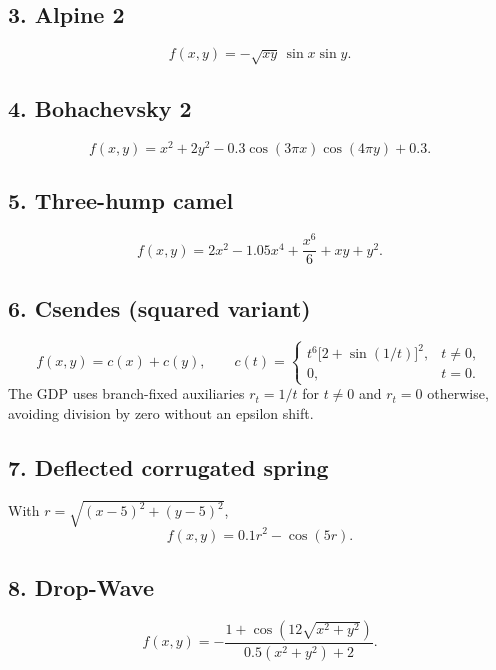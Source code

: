 \subsection*{3. Alpine 2}
\begin{equation}\label{eq:supp-alpine2}
f(x,y)=-\sqrt{xy}\,\sin x\sin y.
\end{equation}

\subsection*{4. Bohachevsky 2}
\begin{equation}\label{eq:supp-bohachevsky2}
f(x,y)=x^2+2y^2-0.3\cos(3\pi x)\cos(4\pi y)+0.3.
\end{equation}

\subsection*{5. Three-hump camel}
\begin{equation}\label{eq:supp-camel3}
f(x,y)=2x^2-1.05x^4+\frac{x^6}{6}+xy+y^2.
\end{equation}

\subsection*{6. Csendes (squared variant)}
\begin{equation}\label{eq:supp-csendes}
f(x,y)=c(x)+c(y),\qquad
c(t)=\begin{cases}
t^6\bigl[2+\sin(1/t)\bigr]^2,&t\ne0,\\
0,&t=0.
\end{cases}
\end{equation}
The GDP uses branch-fixed auxiliaries \(r_t=1/t\) for \(t\ne0\) and \(r_t=0\) otherwise, avoiding division by zero without an epsilon shift.

\subsection*{7. Deflected corrugated spring}
With \(r=\sqrt{(x-5)^2+(y-5)^2}\),
\begin{equation}\label{eq:supp-spring}
f(x,y)=0.1r^2-\cos(5r).
\end{equation}

\subsection*{8. Drop-Wave}
\begin{equation}\label{eq:supp-dropwave}
f(x,y)=-\frac{1+\cos\!\left(12\sqrt{x^2+y^2}\right)}{0.5(x^2+y^2)+2}.
\end{equation}


